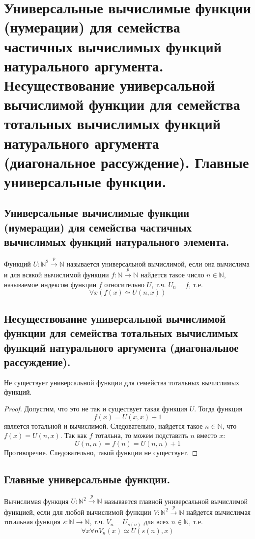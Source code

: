\section{Универсальные вычислимые функции (нумерации) для семейства частичных вычислимых функций натурального аргумента. Несуществование универсальной вычислимой функции для семейства тотальных вычислимых функций натурального аргумента (диагональное рассуждение). Главные универсальные функции.}

\subsection{Универсальные вычислимые функции (нумерации) для семейства частичных вычислимых функций натурального элемента.}

\begin{definition}
  Функций $U : \mathbb{N}^2 \overset{p}{\to} \mathbb{N}$ называется универсальной вычислимой, если она вычислима и для всякой вычислимой функции $f : \mathbb{N} \overset{p}{\to} \mathbb{N}$ найдется такое число $n \in \mathbb{N}$, называемое индексом функции $f$ относительно $U$, т.ч. $U_n = f$, т.е.
  \[
    \forall x (f(x) \simeq U(n, x))
  \] 
\end{definition}

\subsection{Несуществование универсальной вычислимой функции для семейства тотальных вычислимых функций натурального аргумента (диагональное рассуждение).}

\begin{statement}
  Не существует универсальной функции для семейства тотальных вычислимых функций.
  \begin{proof}
    Допустим, что это не так и существует такая функция $U$. Тогда функция
    \[
      f(x) = U(x,x) + 1
    \]
    является тотальной и вычислимой. Следовательно, найдется такое $n \in \mathbb{N}$, что $f(x) = U(n, x)$. Так как $f$ тотальна, то можем подставить $n$ вместо $x$:
    \[
      U(n,n) = f(n) = U(n,n) + 1
    \]
    Противоречие. Следовательно, такой функции не существует.
  \end{proof}
\end{statement}

\subsection{Главные универсальные функции.}

\begin{definition}
  Вычислимая функция $U : \mathbb{N}^2 \overset{p}{\to} \mathbb{N}$ называется главной универсальной вычислимой функцией, если для любой вычислимой функции $V : \mathbb{N}^2 \overset{p}{\to} \mathbb{N}$ найдется вычислимая тотальная функция $s : \mathbb{N} \to \mathbb{N}$, т.ч. $V_n = U_{s(n)}$ для всех $n \in \mathbb{N}$, т.е.
  \[
    \forall x \forall n V_n(x) \simeq U(s(n), x)
  \]
\end{definition}